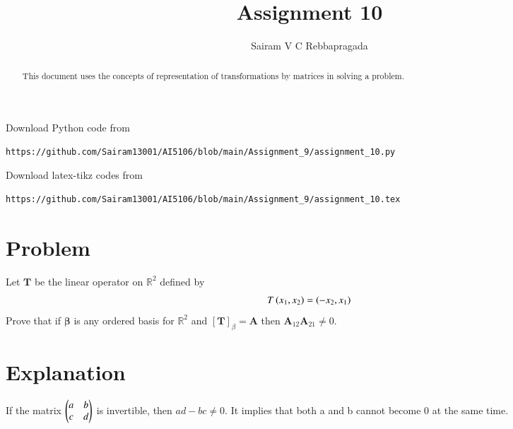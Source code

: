 \documentclass[journal,12pt,twocolumn]{IEEEtran}
\begin{document}
\makeatletter
{}
\makeatother
\let\StandardTheFigure\thefigure
\let\vec\mathbf
\renewcommand{\thefigure}{\theproblem}
\def\putbox#1#2#3{\makebox[0in][l]{\makebox[#1][l]{}\raisebox{\baselineskip}[0in][0in]{\raisebox{#2}[0in][0in]{#3}}}}
     \def\rightbox#1{\makebox[0in][r]{#1}}
     \def\centbox#1{\makebox[0in]{#1}}
     \def\topbox#1{\raisebox{-\baselineskip}[0in][0in]{#1}}
     \def\midbox#1{\raisebox{-0.5\baselineskip}[0in][0in]{#1}}
\vspace{3cm}
\title{Assignment 10}
\author{Sairam V C Rebbapragada}
\maketitle
\newpage
\bigskip
\renewcommand{\thefigure}{\theenumi}
\renewcommand{\thetable}{\theenumi}
\begin{abstract}
This document uses the concepts of representation of transformations by matrices in solving a problem.
\end{abstract}
Download Python code from 
%
\begin{lstlisting}
https://github.com/Sairam13001/AI5106/blob/main/Assignment_9/assignment_10.py
\end{lstlisting}
%
Download latex-tikz codes from 
%
\begin{lstlisting}
https://github.com/Sairam13001/AI5106/blob/main/Assignment_9/assignment_10.tex
\end{lstlisting}
%

\section{Problem}
Let $\mathbf{T}$ be the linear operator on $\mathbb{R}^2$ defined by
\begin{align}
    T\left(x_1, x_2\right) = \left(-x_2, x_1\right) \label{given_lin_op}
\end{align}
Prove that if $\vec{\beta}$ is any ordered basis for $\mathbb{R}^2$ and $[\vec{T}]_\beta = \vec{A}$ then $\vec{A}_{12}\vec{A}_{21} \neq 0$.  
\section{Explanation}
If the matrix $\begin{pmatrix}a & b \\ c & d\end{pmatrix}$ is invertible, then $ad-bc \neq 0$. It implies that both a and b cannot become 0 at the same time.
\end{document}
